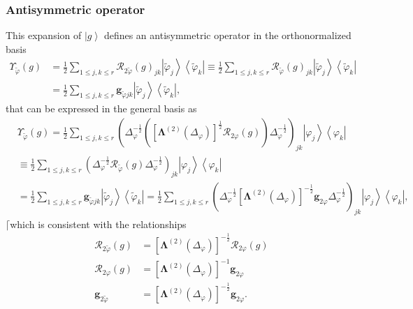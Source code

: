 \documentclass[aps,preprint]{revtex4}%
\begin{document}
\subsubsection{Antisymmetric operator}

This expansion of $\left\vert g\right\rangle $ defines an antisymmetric
operator in the orthonormalized basis
\begin{align}
\Upsilon_{\tilde{\varphi}}\left(  g\right)   &  =\frac{1}{2}\sum_{1\leq
j,k\leq r}\mathcal{R}_{2\tilde{\varphi}}\left(  g\right)  _{jk}\left\vert
\tilde{\varphi}_{j}\right\rangle \left\langle \tilde{\varphi}_{k}\right\vert
\equiv\frac{1}{2}\sum_{1\leq j,k\leq r}\mathcal{R}_{\tilde{\varphi}}\left(
g\right)  _{jk}\left\vert \tilde{\varphi}_{j}\right\rangle \left\langle
\tilde{\varphi}_{k}\right\vert \nonumber\\
&  =\frac{1}{2}\sum_{1\leq j,k\leq r}\mathbf{g}_{\tilde{\varphi}jk}\left\vert
\tilde{\varphi}_{j}\right\rangle \left\langle \tilde{\varphi}_{k}\right\vert ,
\end{align}
that can be expressed in the general basis as%
\begin{align}
&  \Upsilon_{\tilde{\varphi}}\left(  g\right)  =\frac{1}{2}\sum_{1\leq j,k\leq
r}\left(  \Delta_{\varphi}^{-\frac{1}{2}}\left(  \left[  \mathbf{\Lambda
}^{\left(  2\right)  }\left(  \Delta_{\varphi}\right)  \right]  ^{\frac{1}{2}%
}\mathcal{R}_{2\varphi}\left(  g\right)  \right)  \Delta_{\varphi}^{-\frac
{1}{2}}\right)  _{jk}\left\vert \varphi_{j}\right\rangle \left\langle
\varphi_{k}\right\vert \nonumber\\
&  \equiv\frac{1}{2}\sum_{1\leq j,k\leq r}\left(  \Delta_{\varphi}^{-\frac
{1}{2}}\mathcal{R}_{\tilde{\varphi}}\left(  g\right)  \Delta_{\varphi}%
^{-\frac{1}{2}}\right)  _{jk}\left\vert \varphi_{j}\right\rangle \left\langle
\varphi_{k}\right\vert \nonumber\\
&  =\frac{1}{2}\sum_{1\leq j,k\leq r}\mathbf{g}_{\tilde{\varphi}jk}\left\vert
\tilde{\varphi}_{j}\right\rangle \left\langle \tilde{\varphi}_{k}\right\vert
=\frac{1}{2}\sum_{1\leq j,k\leq r}\left(  \Delta_{\varphi}^{-\frac{1}{2}%
}\left[  \mathbf{\Lambda}^{\left(  2\right)  }\left(  \Delta_{\varphi}\right)
\right]  ^{-\frac{1}{2}}\mathbf{g}_{2\varphi}\Delta_{\varphi}^{-\frac{1}{2}%
}\right)  _{jk}\left\vert \varphi_{j}\right\rangle \left\langle \varphi
_{k}\right\vert ,
\end{align}
$\lceil$which is consistent with the relationships%
\begin{align*}
\mathcal{R}_{2\tilde{\varphi}}\left(  g\right)   &  =\left[  \mathbf{\Lambda
}^{\left(  2\right)  }\left(  \Delta_{\varphi}\right)  \right]  ^{-\frac{1}%
{2}}\mathcal{R}_{2\varphi}\left(  g\right) \\
\mathcal{R}_{2\varphi}\left(  g\right)   &  =\left[  \mathbf{\Lambda}^{\left(
2\right)  }\left(  \Delta_{\varphi}\right)  \right]  ^{-1}\mathbf{g}%
_{2\varphi}\\
\mathbf{g}_{2\tilde{\varphi}}  &  =\left[  \mathbf{\Lambda}^{\left(  2\right)
}\left(  \Delta_{\varphi}\right)  \right]  ^{-\frac{1}{2}}\mathbf{g}%
_{2\varphi}.
\end{align*}
\end{document}
